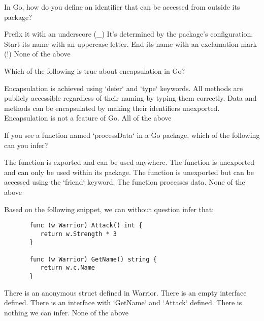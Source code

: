 \documentclass[12pt]{exam}
\begin{document}
\begin{questions}
\question[2]  In Go, how do you define an identifier that can be accessed from outside its package?
\begin{choices}
\choice  Prefix it with an underscore (\_)
\choice  It's determined by the package's configuration.
\CorrectChoice  Start its name with an uppercase letter.
\choice  End its name with an exclamation mark (!)
\choice  None of the above
\end{choices}
 
\question[2]  Which of the following is true about encapsulation in Go?
\begin{choices}
\choice  Encapsulation is achieved using `defer` and `type` keywords.
\choice  All methods are publicly accessible regardless of their naming by typing them correctly.
\CorrectChoice  Data and methods can be encapsulated by making their identifiers unexported.
\choice  Encapsulation is not a feature of Go.
\choice  All of the above
\end{choices}
 
\question[2]  If you see a function named `processData` in a Go package, which of the following can you infer?
\begin{choices}
\choice  The function is exported and can be used anywhere.
\CorrectChoice  The function is unexported and can only be used within its package.
\choice  The function is unexported but can be accessed using the `friend` keyword.
\choice  The function processes data.
\choice  None of the above
\end{choices}
 
\question[2]  Based on the following snippet, we can without question infer that:
\begin{mdframed}[backgroundcolor=bg]
\begin{verbatim}
       func (w Warrior) Attack() int {
          return w.Strength * 3
       }
    
       func (w Warrior) GetName() string {
          return w.c.Name
       }
\end{verbatim}
\end{mdframed}
\begin{choices}
\choice  There is an anonymous struct defined in Warrior.
\choice  There is an empty interface defined.
\CorrectChoice  There is an interface with `GetName` and `Attack` defined.
\choice  There is nothing we can infer.
\choice  None of the above
\end{choices}
 

\end{questions}
\end{document}
